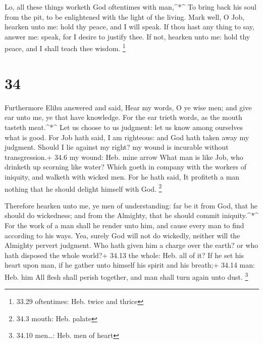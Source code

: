  Lo, all these things worketh God oftentimes with
man,\^{}*\^{}  To bring back his soul from the pit, to be
enlightened with the light of the living.  Mark well, O
Job, hearken unto me: hold thy peace, and I will speak.  If
thou hast any thing to say, answer me: speak, for I desire to justify
thee.  If not, hearken unto me: hold thy peace, and I shall
teach thee wisdom. \footnote{33.29 oftentimes: Heb. twice and thrice}

\hypertarget{section-33}{%
\section{34}\label{section-33}}

 Furthermore Elihu answered and said,  Hear my
words, O ye wise men; and give ear unto me, ye that have knowledge.
 For the ear trieth words, as the mouth tasteth
meat.\^{}*\^{}  Let us choose to us judgment: let us know
among ourselves what is good.  For Job hath said, I am
righteous: and God hath taken away my judgment.  Should I
lie against my right? my wound is incurable without transgression.+ 34.6
my wound: Heb. mine arrow  What man is like Job, who
drinketh up scorning like water?  Which goeth in company
with the workers of iniquity, and walketh with wicked men. 
For he hath said, It profiteth a man nothing that he should delight
himself with God. \footnote{34.3 mouth: Heb. palate}

 Therefore hearken unto me, ye men of understanding: far be
it from God, that he should do wickedness; and from the Almighty, that
he should commit iniquity.\^{}*\^{}  For the work of a man
shall he render unto him, and cause every man to find according to his
ways.  Yea, surely God will not do wickedly, neither will
the Almighty pervert judgment.  Who hath given him a charge
over the earth? or who hath disposed the whole world?+ 34.13 the whole:
Heb. all of it?  If he set his heart upon man, if he gather
unto himself his spirit and his breath;+ 34.14 man: Heb. him
 All flesh shall perish together, and man shall turn again
unto dust. \footnote{34.10 men\ldots: Heb. men of heart}

